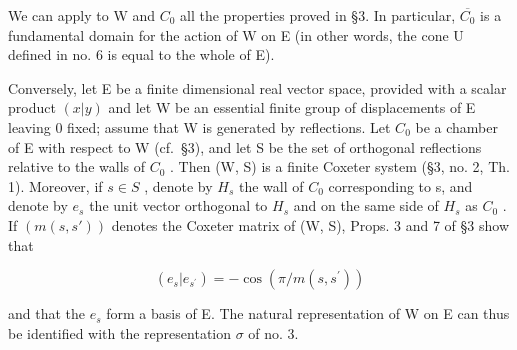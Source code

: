 We can apply to W and \(C_{0}\) all the properties proved in §3. In particular, \(\overline{C_{0}}\) is a fundamental domain for the action of W on E (in other words, the cone U defined in no. 6 is equal to the whole of E).

Conversely, let E be a finite dimensional real vector space, provided with a scalar product \((x|y)\) and let W be an essential finite group of displacements of E leaving 0 fixed; assume that W is generated by reflections. Let \(C_{0}\) be a chamber of E with respect to W (cf.~§3), and let S be the set of orthogonal reflections relative to the walls of \(C_{0}\) . Then (W, S) is a finite Coxeter system (§3, no. 2, Th. 1). Moreover, if \(s \in S\) , denote by \(H_{s}\) the wall of \(C_{0}\) corresponding to s, and denote by \(e_{s}\) the unit vector orthogonal to \(H_{s}\) and on the same side of \(H_{s}\) as \(C_{0}\) . If \((m(s, s'))\) denotes the Coxeter matrix of (W, S), Props. 3 and 7 of §3 show that

\[
(e _ {s} | e _ {s ^ {\prime}}) = - \cos (\pi / m (s, s ^ {\prime}))
\]

and that the \(e_{s}\) form a basis of E. The natural representation of W on E can thus be identified with the representation \(\sigma\) of no. 3.

